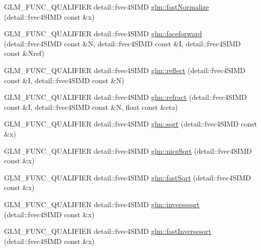 \begin{DoxyCompactItemize}
G\+L\+M\+\_\+\+F\+U\+N\+C\+\_\+\+Q\+U\+A\+L\+I\+F\+I\+E\+R detail\+::fvec4\+S\+I\+M\+D \hyperlink{namespaceglm_a28640ee202fdb12ef3e836c257675043}{glm\+::fast\+Normalize} (detail\+::fvec4\+S\+I\+M\+D const \&x)
\item 
G\+L\+M\+\_\+\+F\+U\+N\+C\+\_\+\+Q\+U\+A\+L\+I\+F\+I\+E\+R detail\+::fvec4\+S\+I\+M\+D \hyperlink{namespaceglm_ae3d9637fb22cf7eecd448c5ad341efab}{glm\+::faceforward} (detail\+::fvec4\+S\+I\+M\+D const \&N, detail\+::fvec4\+S\+I\+M\+D const \&I, detail\+::fvec4\+S\+I\+M\+D const \&Nref)
\item 
G\+L\+M\+\_\+\+F\+U\+N\+C\+\_\+\+Q\+U\+A\+L\+I\+F\+I\+E\+R detail\+::fvec4\+S\+I\+M\+D \hyperlink{namespaceglm_aca05cfddf931415f023b4ac91b96d739}{glm\+::reflect} (detail\+::fvec4\+S\+I\+M\+D const \&I, detail\+::fvec4\+S\+I\+M\+D const \&N)
\item 
G\+L\+M\+\_\+\+F\+U\+N\+C\+\_\+\+Q\+U\+A\+L\+I\+F\+I\+E\+R detail\+::fvec4\+S\+I\+M\+D \hyperlink{namespaceglm_a6b7db0c107279793b77576c2eef680b3}{glm\+::refract} (detail\+::fvec4\+S\+I\+M\+D const \&I, detail\+::fvec4\+S\+I\+M\+D const \&N, float const \&eta)
\item 
G\+L\+M\+\_\+\+F\+U\+N\+C\+\_\+\+Q\+U\+A\+L\+I\+F\+I\+E\+R detail\+::fvec4\+S\+I\+M\+D \hyperlink{namespaceglm_a0af4fc25d7a64d4947598f48a0229375}{glm\+::sqrt} (detail\+::fvec4\+S\+I\+M\+D const \&x)
\item 
G\+L\+M\+\_\+\+F\+U\+N\+C\+\_\+\+Q\+U\+A\+L\+I\+F\+I\+E\+R detail\+::fvec4\+S\+I\+M\+D \hyperlink{namespaceglm_a4b8b68e979fc5b12aba9290beb8dfb30}{glm\+::nice\+Sqrt} (detail\+::fvec4\+S\+I\+M\+D const \&x)
\item 
G\+L\+M\+\_\+\+F\+U\+N\+C\+\_\+\+Q\+U\+A\+L\+I\+F\+I\+E\+R detail\+::fvec4\+S\+I\+M\+D \hyperlink{namespaceglm_a668307d251c9bc5a349ab3d2d83095d4}{glm\+::fast\+Sqrt} (detail\+::fvec4\+S\+I\+M\+D const \&x)
\item 
G\+L\+M\+\_\+\+F\+U\+N\+C\+\_\+\+Q\+U\+A\+L\+I\+F\+I\+E\+R detail\+::fvec4\+S\+I\+M\+D \hyperlink{namespaceglm_ac3ad88ad132bb5179b928f3f57afc6b5}{glm\+::inversesqrt} (detail\+::fvec4\+S\+I\+M\+D const \&x)
\item 
G\+L\+M\+\_\+\+F\+U\+N\+C\+\_\+\+Q\+U\+A\+L\+I\+F\+I\+E\+R detail\+::fvec4\+S\+I\+M\+D \hyperlink{namespaceglm_af499190525c6e1f524054b9b18b12444}{glm\+::fast\+Inversesqrt} (detail\+::fvec4\+S\+I\+M\+D const \&x)
\end{DoxyCompactItemize}
